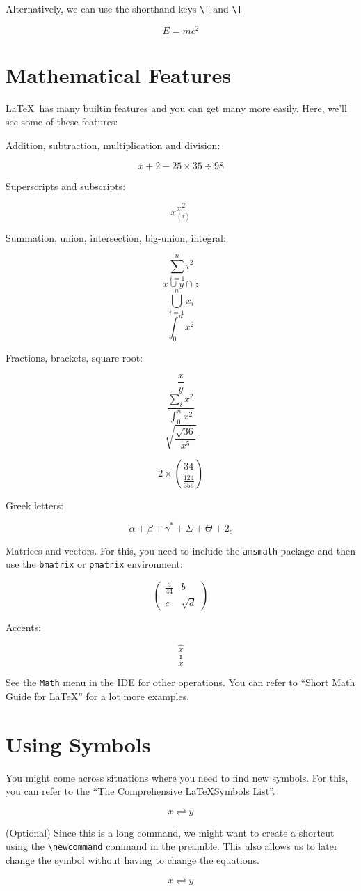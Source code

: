 \documentclass{article}
\newcommand{\flow}{\rightleftharpoons}
\begin{document}
Alternatively, we can use the shorthand keys \verb|\[| and \verb|\]|

\[
E=mc^2
\]

\section{Mathematical Features}
\LaTeX\ has many builtin features and you can get many more easily. Here, we'll see some of these features: 

Addition, subtraction, multiplication and division: 

\[
x+2 - 25 \times 35 \div 98 
\]

Superscripts and subscripts: 

\[ x^2  \]
\[ x_{(i)} \]


Summation, union, intersection, big-union, integral: 

\[ \sum_{i=1}^{n}{i^2} \]
\[ x \cup y \cap z \]
\[ \bigcup_{i=1}^{n}{x_i} \]
\[ \int_0^n{x^2} \]

Fractions, brackets, square root: 

\[ \frac{x}{y} \]
\[ \frac{\sum_i{x^2}}{\int_0^n{x^2}} \]
\[ \sqrt{\frac{\sqrt{36}} {x^5}} \]

\[ 2 \times \left( \frac{34}{\frac{124}{356}}    \right)  \]

Greek letters: 

\[
\alpha + \beta + \gamma^* + \Sigma + \Theta + 2_\epsilon 
\]

Matrices and vectors. For this, you need to include the \texttt{amsmath} package and then use the \texttt{bmatrix} or \texttt{pmatrix} environment: 

\[
\begin{pmatrix}
\frac{a}{44} & b \\ 
c & \sqrt{d} 	
\end{pmatrix}
\]

Accents: 

\[ \hat{x} \]
\[ \hat{\imath} \] 
\[ \dot{x} \]

See the \texttt{Math} menu in the IDE for other operations. You can refer to ``Short Math Guide for \LaTeX'' for a lot more examples. 

\section{Using Symbols}
You might come across situations where you need to find new symbols. For this, you can refer to the ``The Comprehensive \LaTeX Symbols List''.  

\[ x \rightleftharpoons  y \]



(Optional) Since this is a long command, we might want to create a shortcut using the \verb|\newcommand| command in the preamble. This also allows us to later change the symbol without having to change the equations. 

\[ x \flow y \]
\end{document}

